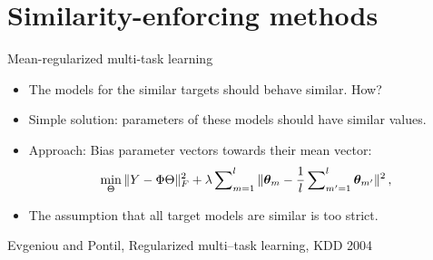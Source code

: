 \documentclass[11pt,compress,t,notes=noshow, xcolor=table]{beamer}
\begin{document}
\section{Similarity-enforcing methods}

\begin{frame}{Mean-regularized multi-task learning}
\begin{minipage}{0.5\textwidth}
    \begin{itemize} 				
        \item The models for the similar targets should behave similar. How?
        
        \item Simple solution: parameters of these models should have similar values.
    \end{itemize}
    
\end{minipage}
\hfill
\begin{minipage}{0.45\textwidth}
    
\end{minipage}

\begin{itemize}
    \item Approach: Bias parameter vectors towards their mean vector:
    \begin{equation*}
            \label{eq:meanreg}
            \min_\Theta \|Y - \Phi \Theta \|^2_F + \lambda \sum\nolimits_{m=1}^l \|\bm{\theta}_m - \frac{1}{l} \sum\nolimits_{m'=1}^l \bm{\theta}_{m'} \|^2 \, ,
    \end{equation*}
    
    \item The assumption that all target models are similar is too strict.
\end{itemize}
{\tiny Evgeniou and Pontil, Regularized multi--task learning, KDD 2004}
\end{frame}
\end{document}
